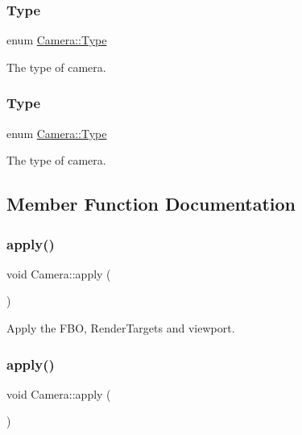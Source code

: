 \subsubsection{\texorpdfstring{Type}{Type}\hspace{0.1cm}{\footnotesize\ttfamily [1/2]}}
{\footnotesize\ttfamily enum \hyperlink{classCamera_a3b0a1f58deca679ac665f61c480d1dcb}{Camera\+::\+Type}\hspace{0.3cm}{\ttfamily [strong]}}

The type of camera. \mbox{\label{classCamera_a3b0a1f58deca679ac665f61c480d1dcb}} 
\subsubsection{\texorpdfstring{Type}{Type}\hspace{0.1cm}{\footnotesize\ttfamily [2/2]}}
{\footnotesize\ttfamily enum \hyperlink{classCamera_a3b0a1f58deca679ac665f61c480d1dcb}{Camera\+::\+Type}\hspace{0.3cm}{\ttfamily [strong]}}

The type of camera. 

\subsection{Member Function Documentation}
\mbox{\label{classCamera_a767aa79833180926e267f9ec82c44577}} 
\subsubsection{\texorpdfstring{apply()}{apply()}\hspace{0.1cm}{\footnotesize\ttfamily [1/2]}}
{\footnotesize\ttfamily void Camera\+::apply (\begin{DoxyParamCaption}{ }\end{DoxyParamCaption})}

Apply the F\+BO, Render\+Targets and viewport. \mbox{\label{classCamera_a767aa79833180926e267f9ec82c44577}} 
\subsubsection{\texorpdfstring{apply()}{apply()}\hspace{0.1cm}{\footnotesize\ttfamily [2/2]}}
{\footnotesize\ttfamily void Camera\+::apply (\begin{DoxyParamCaption}{ }\end{DoxyParamCaption})}

